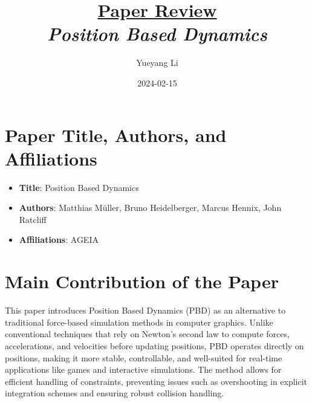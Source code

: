 \documentclass[12pt]{article}
\newcommand{\paperTitle}{
    \textit{\normalsize{Position Based Dynamics}}  
}
\begin{document}
\title{\Large\uline{\textbf{Paper Review}} \\[0.4em]
\paperTitle{} 
}
\author{Yueyang Li}
\date{2024-02-15}

\maketitle

\section{Paper Title, Authors, and Affiliations}
\begin{itemize}[noitemsep]
    \item \textbf{Title}: Position Based Dynamics
    \item \textbf{Authors}: Matthias Müller, Bruno Heidelberger, Marcus Hennix, John Ratcliff
    \item \textbf{Affiliations}: AGEIA
\end{itemize}

\section{Main Contribution of the Paper}
This paper introduces Position Based Dynamics (PBD) as an alternative to traditional force-based simulation methods in computer graphics. Unlike conventional techniques that rely on Newton's second law to compute forces, accelerations, and velocities before updating positions, PBD operates directly on positions, making it more stable, controllable, and well-suited for real-time applications like games and interactive simulations. The method allows for efficient handling of constraints, preventing issues such as overshooting in explicit integration schemes and ensuring robust collision handling.
\end{document}
